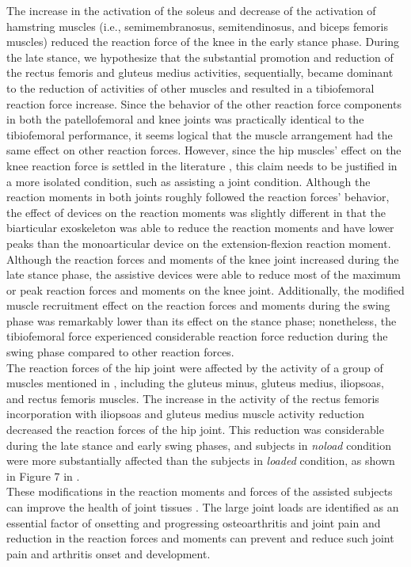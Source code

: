 \documentclass[10pt,letterpaper]{article}
\begin{document}
The increase in the activation of the soleus and decrease of the activation of hamstring muscles (i.e., semimembranosus, semitendinosus, and biceps femoris muscles) reduced the reaction force of the knee in the early stance phase. During the late stance, we hypothesize that the substantial promotion and reduction of the rectus femoris and gluteus medius activities, sequentially, became dominant to the reduction of activities of other muscles and resulted in a tibiofemoral reaction force increase. Since the behavior of the other reaction force components in both the patellofemoral and knee joints was practically identical to the tibiofemoral performance, it seems logical that the muscle arrangement had the same effect on other reaction forces. However, since the hip muscles' effect on the knee reaction force is settled in the literature \cite{170,171}, this claim needs to be justified in a more isolated condition, such as assisting a joint condition. Although the reaction moments in both joints roughly followed the reaction forces' behavior, the effect of devices on the reaction moments was slightly different in that the biarticular exoskeleton was able to reduce the reaction moments and have lower peaks than the monoarticular device on the extension-flexion reaction moment.\\
Although the reaction forces and moments of the knee joint increased during the late stance phase, the assistive devices were able to reduce most of the maximum or peak reaction forces and moments on the knee joint. Additionally, the modified muscle recruitment effect on the reaction forces and moments during the swing phase was remarkably lower than its effect on the stance phase; nonetheless, the tibiofemoral force experienced considerable reaction force reduction during the swing phase compared to other reaction forces.\\
The reaction forces of the hip joint were affected by the activity of a group of muscles mentioned in \cite{170}, including the gluteus minus, gluteus medius, iliopsoas, and rectus femoris muscles. The increase in the activity of the rectus femoris incorporation with iliopsoas and gluteus medius muscle activity reduction decreased the reaction forces of the hip joint. This reduction was considerable during the late stance and early swing phases, and subjects in {\it noload} condition were more substantially affected than the subjects in {\it loaded} condition, as shown in Figure 7 in . \\
These modifications in the reaction moments and forces of the assisted subjects can improve the health of joint tissues \cite{178}. The large joint loads are identified as an essential factor of onsetting and progressing osteoarthritis \cite{172,176,177} and joint pain \cite{175} and reduction in the reaction forces and moments can prevent and reduce such joint pain and arthritis onset and development.
\end{document}
